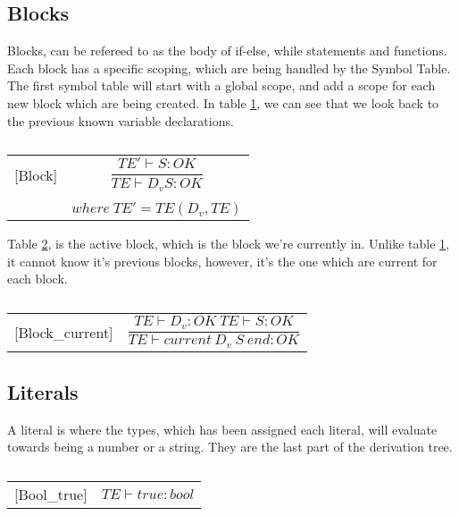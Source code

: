 \subsection{Blocks}
Blocks, can be refereed to as the body of if-else, while statements and functions. Each block has a specific scoping, which are being handled by the Symbol Table. The first symbol table will start with a global scope, and add a scope for each new block which are being created. In table \ref{block}, we can see that we look back to the previous known variable declarations. 
\begin{table}[H]
    \begin{center}
    \begin{longtable}[c] { r c }
        [Block] 
        & 
        \( \dfrac{TE' \vdash S : OK} 
        {TE \vdash D_v S : OK} \) 
        \\ \\
        & 
        \( {where \ TE' = TE(D_v, TE)} \)
    \end{longtable}
    \caption{}\label{block}
        \end{center}
\end{table}

Table \ref{active-block}, is the active block, which is the block we're currently in. Unlike table \ref{block}, it cannot know it's previous blocks, however, it's the one which are current for each block.
\begin{table}[H]
    \begin{center}
    \begin{longtable}[c] { r c }
        [Block_{current}] 
        & 
        \( \dfrac{TE \vdash D_{v} : OK \ TE \vdash S : OK} 
        {TE \vdash current \ D_{v} \ S \ end  :  OK} \)
    \end{longtable}
    \caption{}\label{active-block}
        \end{center}
\end{table}

\subsection{Literals}
A literal is where the types, which has been assigned each literal, will evaluate towards being a number or a string. They are the last part of the derivation tree.

\begin{table}[H]
    \centering
    \begin{longtable}[c] { r c }
        [Bool_{true}] & 
        \( {TE \vdash true : bool} \) \\
    \end{longtable}
    \caption{}\label{s-empty}
\end{table}


